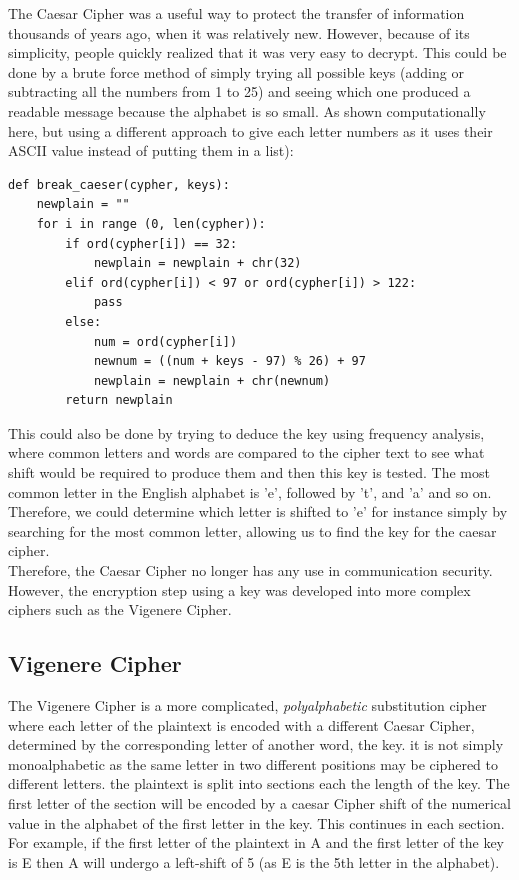 \documentclass{article}
\begin{document}
The Caesar Cipher was a useful way to protect the transfer of information
thousands of years ago, when it was relatively new. However, because of its
simplicity, people quickly realized that it was very easy to decrypt. This
could be done by a brute force method of simply trying all possible keys
(adding or subtracting all the numbers from 1 to 25) and seeing which one
produced a readable message because the alphabet is so small. As shown
computationally here, but using a different approach to give each letter
numbers as it uses their ASCII value instead of putting them in a list):
\medskip
\begin{lstlisting}
def break_caeser(cypher, keys):
    newplain = ""
    for i in range (0, len(cypher)):
        if ord(cypher[i]) == 32:
            newplain = newplain + chr(32)
        elif ord(cypher[i]) < 97 or ord(cypher[i]) > 122:
            pass
        else:
            num = ord(cypher[i])
            newnum = ((num + keys - 97) % 26) + 97
            newplain = newplain + chr(newnum)
        return newplain      
\end{lstlisting}
This could also be done by trying to deduce the key using frequency analysis,
where common letters and words are compared to the cipher text to see what
shift would be required to produce them and then this key is tested.
The most common letter in the English alphabet is 'e', followed by 't', and 'a'
and so on. Therefore, we could determine which letter is shifted to 'e' for instance
simply by searching for the most common letter, allowing us to find the key for the
caesar cipher.
\\
Therefore, the Caesar Cipher no longer has any use in communication security.
However, the encryption step using a key was developed into more complex
ciphers such as the Vigenere Cipher.

\subsection{Vigenere Cipher}
The Vigenere Cipher is a more complicated, \textit{polyalphabetic} substitution
cipher where each letter of the plaintext is encoded with a different Caesar
Cipher, determined by the corresponding letter of another word, the key. it is
not simply monoalphabetic as the same letter in two different positions may be
ciphered to different letters. the plaintext is split into sections each the
length of the key. The first letter of the section will be encoded by a caesar
Cipher shift of the numerical value in the alphabet of the first letter in the
key. This continues in each section. For example, if the first letter of the
plaintext in A and the first letter of the key is E then A will undergo a
left-shift of 5 (as E is the 5th letter in the alphabet).
\medskip
\end{document}
